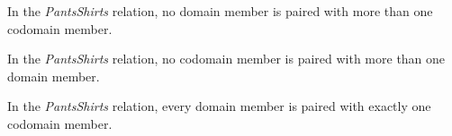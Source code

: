 \documentclass{ximera}
\begin{document}
\begin{exercise}
\begin{question} 
In the \textit{PantsShirts} relation, no domain member is paired with more than one codomain member.

\begin{multipleChoice}
\end{multipleChoice}
\end{question}








\begin{question} 
In the \textit{PantsShirts} relation, no codomain member is paired with more than one domain member.

\begin{multipleChoice}
\end{multipleChoice}
\end{question}








\begin{question} 
In the \textit{PantsShirts} relation, every domain member is paired with exactly one codomain member.

\begin{multipleChoice}
\end{multipleChoice}
\end{question}







\end{exercise}
\end{document}
